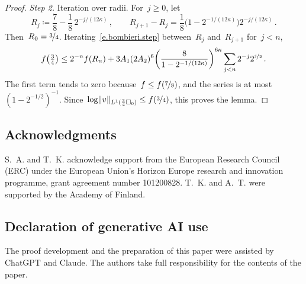 \documentclass[11pt,letterpaper]{article}
\numberwithin{equation}{section}
\theoremstyle{definition}
\newcommand{\nf}{\nicefrac}
\newcommand{\cu}{\square}
\DeclarePairedDelimiter{\norm}{\lVert}{\rVert}
\begin{document}
\begin{proof}
\smallskip

\emph{Step 2.} Iteration over radii. For~$j\geq0$, let
\begin{equation*}
	R_j\coloneqq\frac78-\frac18\,2^{-j/(12\kappa)}\,,\qquad R_{j+1}-R_j=\frac18\bigl(1-2^{-1/(12\kappa)}\bigr)2^{-j/(12\kappa)}\,.
\end{equation*}
Then~$R_0=\nf34$. Iterating~\eqref{e.bombieri.step} between~$R_j$ and~$R_{j+1}$ for~$j<n$,
\begin{equation*}
	f\bigl(\tfrac34\bigr)\leq2^{-n}f(R_n)+3A_1(2A_2)^6\biggl(\frac8{1-2^{-1/(12\kappa)}}\biggr)^{6\kappa}\sum_{j<n}2^{-j}2^{\nf j2}\,.
\end{equation*}
The first term tends to zero because~$f\leq f(\nf78)$, and the series is at most~$(1-2^{-1/2})^{-1}$. Since~$\log\norm{v}_{L^1(\frac34\cu_0)}\leq f(\nf34)$, this proves the lemma.
\end{proof}

\subsection*{Acknowledgments}
S.~A. and T.~K. acknowledge support from the European Research Council (ERC) under the European Union's Horizon Europe research and innovation programme, grant agreement number 101200828. T.~K. and A.~T. were supported by the Academy of Finland.

\subsection*{Declaration of generative AI use}
The proof development and the preparation of this paper were assisted by ChatGPT and Claude. The authors take full responsibility for the contents of the paper.
\end{document}
